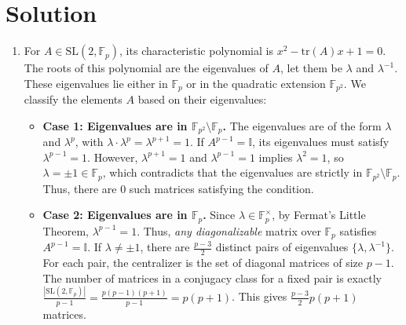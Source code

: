 \documentclass[10pt,a4paper]{article}
\begin{document}
\newpage
\section*{Solution}
\begin{enumerate}[label=\fbox{\arabic*}]
  \item %
        For $A \in \mathrm{SL}(2, \mathbb{F}_p)$, its characteristic polynomial is $x^2 - \mathrm{tr}(A)x + 1 = 0$. The roots of this polynomial are the eigenvalues of $A$, let them be $\lambda$ and $\lambda^{-1}$. These eigenvalues lie either in $\mathbb{F}_p$ or in the quadratic extension $\mathbb{F}_{p^2}$. We classify the elements $A$ based on their eigenvalues:
        \begin{itemize}
            \item \textbf{Case 1: Eigenvalues are in $\mathbb{F}_{p^2} \setminus \mathbb{F}_p$.}
            The eigenvalues are of the form $\lambda$ and $\lambda^p$, with $\lambda \cdot \lambda^p = \lambda^{p+1} = 1$. If $A^{p-1} = \mathbb{I}$, its eigenvalues must satisfy $\lambda^{p-1} = 1$. However, $\lambda^{p+1} = 1$ and $\lambda^{p-1} = 1$ implies $\lambda^2 = 1$, so $\lambda = \pm 1 \in \mathbb{F}_p$, which contradicts that the eigenvalues are strictly in $\mathbb{F}_{p^2} \setminus \mathbb{F}_p$. Thus, there are $0$ such matrices satisfying the condition.
            
            \item \textbf{Case 2: Eigenvalues are in $\mathbb{F}_p$.}
            Since $\lambda \in \mathbb{F}_p^\times$, by Fermat's Little Theorem, $\lambda^{p-1} = 1$. Thus, \emph{any diagonalizable} matrix over $\mathbb{F}_p$ satisfies $A^{p-1} = \mathbb{I}$.
            If $\lambda \neq \pm 1$, there are $\frac{p-3}{2}$ distinct pairs of eigenvalues $\{\lambda, \lambda^{-1}\}$. For each pair, the centralizer is the set of diagonal matrices of size $p-1$. The number of matrices in a conjugacy class for a fixed pair is exactly $\frac{|\mathrm{SL}(2, \mathbb{F}_p)|}{p-1} = \frac{p(p-1)(p+1)}{p-1} = p(p+1)$. This gives $\frac{p-3}{2} p(p+1)$ matrices.
            

\end{itemize}
\end{enumerate}
\end{document}
